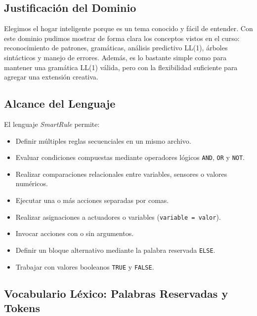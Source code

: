 \documentclass[12pt,a4paper]{article}
\begin{document}
\subsection{Justificación del Dominio}
Elegimos el hogar inteligente porque es un tema conocido y fácil de entender. Con este dominio pudimos mostrar de forma clara los conceptos vistos en el curso: reconocimiento de patrones, gramáticas, análisis predictivo LL(1), árboles sintácticos y manejo de errores. Además, es lo bastante simple como para mantener una gramática LL(1) válida, pero con la flexibilidad suficiente para agregar una extensión creativa.

\subsection{Alcance del Lenguaje}
El lenguaje \textit{SmartRule} permite:
\begin{itemize}[leftmargin=1cm]
    \item Definir múltiples reglas secuenciales en un mismo archivo.
    \item Evaluar condiciones compuestas mediante operadores lógicos \texttt{AND}, \texttt{OR} y \texttt{NOT}.
    \item Realizar comparaciones relacionales entre variables, sensores o valores numéricos.
    \item Ejecutar una o más acciones separadas por comas.
    \item Realizar asignaciones a actuadores o variables (\texttt{variable = valor}).
    \item Invocar acciones con o sin argumentos.
    \item Definir un bloque alternativo mediante la palabra reservada \texttt{ELSE}.
    \item Trabajar con valores booleanos \texttt{TRUE} y \texttt{FALSE}.
\end{itemize}

\subsection{Vocabulario Léxico: Palabras Reservadas y Tokens}
\end{document}
